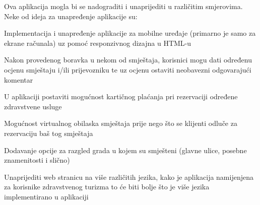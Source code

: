 		
		{Ova aplikacija mogla bi se nadograditi i unaprijediti u različitim smjerovima. Neke od ideja za unapređenje aplikacije su:}
		\begin{packed_item}
			\item Implementacija i unapređenje aplikacije za mobilne uređaje (primarno je samo za ekrane računala) uz pomoć responzivnog dizajna u HTML-u
			
			\item Nakon provedenog boravka u nekom od smještaja, korisnici mogu dati određenu ocjenu smještaju i/ili prijevozniku te uz ocjenu ostaviti neobavezni odgovarajući komentar
			
			\item U aplikaciji postaviti mogućnost kartičnog plaćanja pri rezervaciji određene zdravstvene usluge
			
			\item Mogućnost virtualnog obilaska smještaja prije nego što se klijenti odluče za rezervaciju baš tog smještaja
			
			\item Dodavanje opcije za razgled grada u kojem su smješteni (glavne ulice, posebne znamenitosti i slično)
			
			\item Unaprijediti web stranicu na više različitih jezika, kako je aplikacija namijenjena za korisnike zdravstvenog turizma to će biti bolje što je više jezika implementirano u aplikaciji
		\end{packed_item}
		
		
		
		
		
		
		
	